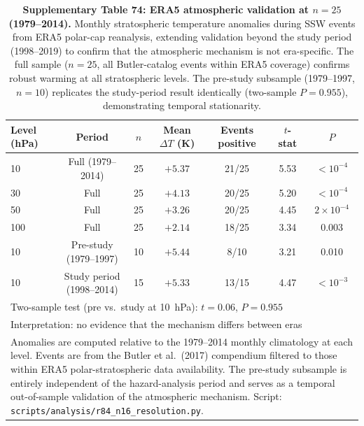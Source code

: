 \documentclass[11pt,letterpaper]{article}
\begin{document}
\begin{table}[!ht]
\centering
\caption{\textbf{Supplementary Table 74: ERA5 atmospheric validation at $n = 25$ (1979--2014).}
Monthly stratospheric temperature anomalies during SSW events from ERA5 polar-cap reanalysis, extending validation beyond the study period (1998--2019) to confirm that the atmospheric mechanism is not era-specific. The full sample ($n = 25$, all Butler-catalog events within ERA5 coverage) confirms robust warming at all stratospheric levels. The pre-study subsample (1979--1997, $n = 10$) replicates the study-period result identically (two-sample $P = 0.955$), demonstrating temporal stationarity.}
\label{tab:era5_n25}
\small
\begin{tabular}{lcccccc}
\toprule
Level (hPa) & Period & $n$ & Mean $\Delta T$ (K) & Events positive & $t$-stat & $P$ \\
\midrule
10 & Full (1979--2014) & 25 & $+5.37$ & 21/25 & 5.53 & $<10^{-4}$ \\
30 & Full & 25 & $+4.13$ & 20/25 & 5.20 & $<10^{-4}$ \\
50 & Full & 25 & $+3.26$ & 20/25 & 4.45 & $2 \times 10^{-4}$ \\
100 & Full & 25 & $+2.14$ & 18/25 & 3.34 & 0.003 \\
\midrule
10 & Pre-study (1979--1997) & 10 & $+5.44$ & 8/10 & 3.21 & 0.010 \\
10 & Study period (1998--2014) & 15 & $+5.33$ & 13/15 & 4.47 & $<10^{-3}$ \\
\midrule
\multicolumn{7}{l}{Two-sample test (pre vs.\ study at 10~hPa): $t = 0.06$, $P = 0.955$} \\
\multicolumn{7}{l}{Interpretation: no evidence that the mechanism differs between eras} \\
\bottomrule
\multicolumn{7}{p{14cm}}{\footnotesize Anomalies are computed relative to the 1979--2014 monthly climatology at each level. Events are from the Butler et al.\ (2017) compendium filtered to those within ERA5 polar-stratospheric data availability. The pre-study subsample is entirely independent of the hazard-analysis period and serves as a temporal out-of-sample validation of the atmospheric mechanism. Script: \texttt{scripts/analysis/r84\_n16\_resolution.py}.} \\
\end{tabular}
\end{table}

\end{document}
